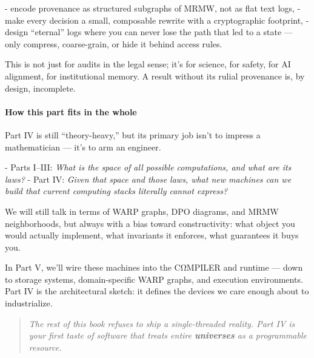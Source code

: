 - encode provenance as structured subgraphs of MRMW, not as flat text logs,
- make every decision a small, composable rewrite with a cryptographic footprint,
- design “eternal” logs where you can never lose the path that led to a state — only compress, coarse-grain, or hide it behind access rules.

This is not just for audits in the legal sense; it’s for science, for safety, for AI alignment, for institutional memory. A result without its rulial provenance is, by design, incomplete.

\paragraph{How this part fits in the whole}

Part IV is still “theory-heavy,” but its primary job isn’t to impress a mathematician — it’s to arm an engineer.

- Parts I–III: \emph{What is the space of all possible computations, and what are its laws?}
- Part IV: \emph{Given that space and those laws, what new machines can we build that current computing stacks literally cannot express?}

We will still talk in terms of WARP graphs, DPO diagrams, and MRMW neighborhoods, but always with a bias toward constructivity: what object you would actually implement, what invariants it enforces, what guarantees it buys you.

In Part V, we’ll wire these machines into the CΩMPILER and runtime — down to storage systems, domain-specific WARP graphs, and execution environments. Part IV is the architectural sketch: it defines the devices we care enough about to industrialize.

\begin{quote}
\emph{The rest of this book refuses to ship a single-threaded reality. Part IV is your first taste of software that treats entire \textbf{universes} as a programmable resource.}
\end{quote}
